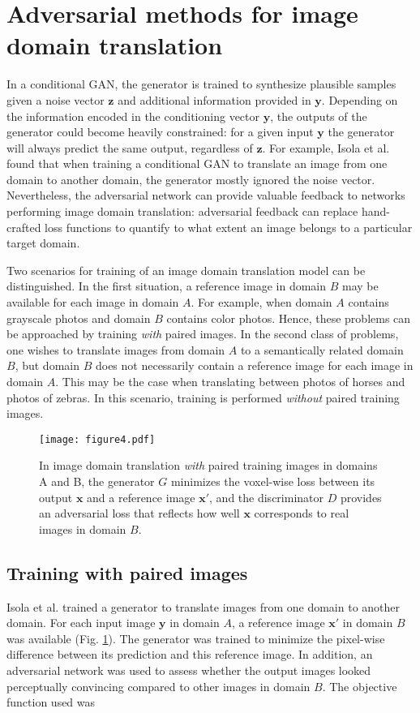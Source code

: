 \documentclass{article}
\begin{document}
\section{Adversarial methods for image domain translation}
\label{sec:advmethods}
In a conditional GAN, the generator is trained to synthesize plausible samples given a noise vector $\mathbf{z}$ and additional information provided in $\mathbf{y}$. Depending on the information encoded in the conditioning vector $\mathbf{y}$, the outputs of the generator could become heavily constrained: for a given input $\mathbf{y}$ the generator will always predict the same output, regardless of $\mathbf{z}$. For example, Isola et al. \cite{Isol17} found that when training a conditional GAN to translate an image from one domain to another domain, the generator mostly ignored the noise vector. Nevertheless, the adversarial network can provide valuable feedback to networks performing image domain translation: adversarial feedback can replace hand-crafted loss functions to quantify to what extent an image belongs to a particular target domain.

Two scenarios for training of an image domain translation model can be distinguished. In the first situation, a reference image in domain $B$ may be available for each image in domain $A$. For example, when domain $A$ contains grayscale photos and domain $B$ contains color photos. Hence, these problems can be approached by training \textit{with} paired images. In the second class of problems, one wishes to translate images from domain $A$ to a semantically related domain $B$, but domain $B$ does not necessarily contain a reference image for each image in domain $A$. This may be the case when translating between photos of horses and photos of zebras. In this scenario, training is performed \textit{without} paired training images.

\begin{figure}[tp]
\centering
\texttt{[image: figure4.pdf]}
\caption{In image domain translation \textit{with} paired training images in domains A and B, the generator $G$ minimizes the voxel-wise loss between its output $\mathbf{x}$ and a reference image $\mathbf{x'}$, and the discriminator $D$ provides an adversarial loss that reflects how well $\mathbf{x}$ corresponds to real images in domain $B$.}
\label{fig:pix2pix}
\end{figure}

\subsection{Training with paired images}
\label{sec:pix2pix}
Isola et al. \cite{Isol17} trained a generator to translate images from one domain to another domain. For each input image $\mathbf{y}$ in domain $A$, a reference image $\mathbf{x'}$ in domain $B$ was available (Fig. \ref{fig:pix2pix}). The generator was trained to minimize the pixel-wise difference between its prediction and this reference image. In addition, an adversarial network was used to assess whether the output images looked perceptually convincing compared to other images in domain $B$. The objective function used was
\end{document}
